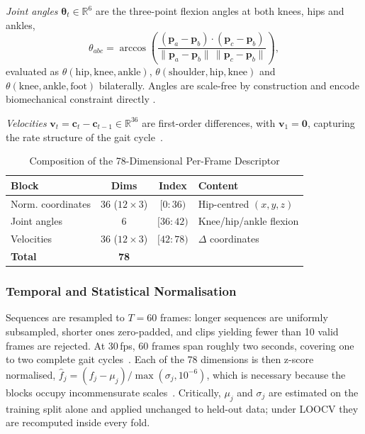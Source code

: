 \documentclass[journal]{IEEEtran}
\newcommand{\tabhead}[1]{\textbf{#1}}
\begin{document}
\emph{Joint angles} $\boldsymbol{\theta}_t \in \mathbb{R}^{6}$ are the
three-point flexion angles at both knees, hips and ankles,
\begin{equation}
\theta_{abc} = \arccos\!\left(
\frac{(\mathbf{p}_a - \mathbf{p}_b) \cdot (\mathbf{p}_c - \mathbf{p}_b)}
{\lVert \mathbf{p}_a - \mathbf{p}_b \rVert \,
 \lVert \mathbf{p}_c - \mathbf{p}_b \rVert}\right),
\end{equation}
evaluated as $\theta(\text{hip},\text{knee},\text{ankle})$,
$\theta(\text{shoulder},\text{hip},\text{knee})$ and
$\theta(\text{knee},\text{ankle},\text{foot})$ bilaterally. Angles are
scale-free by construction and encode biomechanical constraint directly
\cite{perry_gait,whittle_gait}.

\emph{Velocities} $\mathbf{v}_t = \mathbf{c}_t - \mathbf{c}_{t-1} \in
\mathbb{R}^{36}$ are first-order differences, with $\mathbf{v}_1 = \mathbf{0}$,
capturing the rate structure of the gait cycle~\cite{phinyomark}.

\begin{table}[!t]
\caption{Composition of the 78-Dimensional Per-Frame Descriptor}
\label{tab:features}
\centering
\footnotesize
\begin{tabular}{@{}lccl@{}}
\toprule
\tabhead{Block} & \tabhead{Dims} & \tabhead{Index} & \tabhead{Content} \\
\midrule
Norm. coordinates & 36 ($12\times3$) & $[0{:}36)$  & Hip-centred $(x,y,z)$ \\
Joint angles      & 6                & $[36{:}42)$ & Knee/hip/ankle flexion \\
Velocities             & 36 ($12\times3$) & $[42{:}78)$ & $\Delta$ coordinates \\
\midrule
\textbf{Total}         & \textbf{78}      &             & \\
\bottomrule
\end{tabular}
\end{table}

\subsubsection{Temporal and Statistical Normalisation}
Sequences are resampled to $T = 60$ frames: longer sequences are uniformly
subsampled, shorter ones zero-padded, and clips yielding fewer than 10 valid
frames are rejected. At 30\,fps, 60 frames span roughly two seconds, covering
one to two complete gait cycles~\cite{perry_gait}. Each of the 78 dimensions is
then z-score normalised,
$\hat{f}_j = (f_j - \mu_j)/\max(\sigma_j, 10^{-6})$,
which is necessary because the blocks occupy incommensurate
scales~\cite{lecun_efficient}. Critically, $\mu_j$ and $\sigma_j$ are estimated
on the training split alone and applied unchanged to held-out data; under LOOCV
they are recomputed inside every fold.
\end{document}
